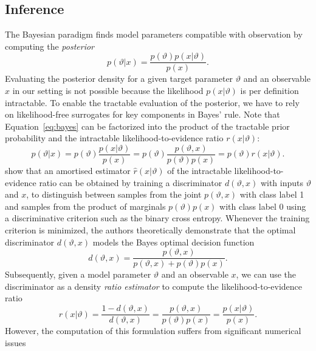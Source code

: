 \documentclass[fleqn,usenatbib]{mnras}
\begin{document}
\subsection{Inference}
\label{sec:inference}
The Bayesian paradigm finds model parameters compatible with observation by
computing the \emph{posterior}
\begin{equation}
  \label{eq:bayes}
  p(\vartheta\vert x) = \frac{p(\vartheta)p(x\vert\vartheta)}{p(x)}.
\end{equation}
Evaluating the posterior density for a given target parameter $\vartheta$ and an observable $x$
in our setting is not possible because the
likelihood $p(x\vert\vartheta)$ is per definition intractable.
To enable the tractable evaluation
of the posterior, we have to rely on likelihood-free surrogates
for key components in Bayes' rule.
Note that Equation~\ref{eq:bayes} can be factorized into
the product of the tractable prior probability and the intractable
likelihood-to-evidence ratio $r(x\vert\vartheta)$:
\begin{equation}
    p(\vartheta\vert x) = p(\vartheta)\frac{p(x\vert\vartheta)}{p(x)} = p(\vartheta)\frac{p(\vartheta,x)}{p(\vartheta)p(x)} = p(\vartheta)r(x\vert\vartheta).
\end{equation}
\citet{2019arXiv190304057H} show that an amortised estimator $\hat{r}(x\vert\vartheta)$
of the intractable likelihood-to-evidence ratio can be obtained
by training a discriminator $d(\vartheta, x)$ with inputs $\vartheta$ and $x$, to distinguish between samples from the
joint $p(\vartheta, x)$ with class label 1 and samples from the product of marginals $p(\vartheta)p(x)$ with class label 0 using a discriminative criterion such
as the binary cross entropy.
Whenever the training criterion is minimized,
the authors theoretically
demonstrate that the optimal discriminator $d(\vartheta, x)$
models the Bayes optimal decision function
\begin{equation}
  d(\vartheta, x) = \frac{p(\vartheta, x)}{p(\vartheta,x) + p(\vartheta)p(x)}.
\end{equation}
Subsequently, given a model parameter $\vartheta$ and an observable $x$,
we can use the discriminator as a density \emph{ratio estimator}
to compute the likelihood-to-evidence ratio
\begin{equation}
  r(x\vert\vartheta) = \frac{1 - d(\vartheta,x)}{d(\vartheta,x)} = \frac{p(\vartheta, x)}{p(\vartheta)p(x)} = \frac{p(x\vert\vartheta)}{p(x)} .
\end{equation}
However, the computation of this formulation suffers from significant numerical issues
\end{document}
